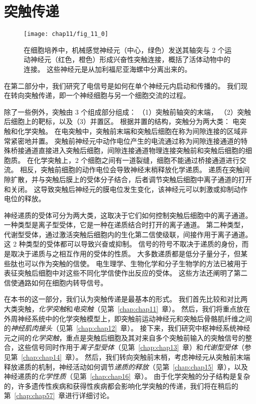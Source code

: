 \part{突触传递}


\begin{figure}[htbp]
	\centering
	\texttt{[image: chap11/fig\_11\_0]}
	\caption{在细胞培养中，机械感觉神经元（中心，绿色）发送其轴突与 2 个运动神经元（红色，橙色）形成兴奋性突触连接，概括了活体动物中的连接。
		这些神经元是从加利福尼亚海螺中分离出来的。}
	\label{fig:11_0}
\end{figure}


在第二部分中，我们研究了电信号是如何在单个神经元内启动和传播的。
我们现在转向突触传递，即一个神经细胞与另一个细胞交流的过程。


除了一些例外，突触由 3 个组成部分组成：
（1）突触前轴突的末端，
（2）突触后细胞上的靶标，以及（3）并置区。
根据并置的结构，突触分为两大类：
电突触和化学突触。
在电突触中，突触前末端和突触后细胞在称为间隙连接的区域非常紧密地并置。
突触前神经元中动作电位产生的电流通过称为间隙连接通道的特殊桥接通道直接进入突触后细胞，间隙连接通道物理连接突触前和突触后细胞的细胞质。
在化学突触上，2 个细胞之间有一道裂缝，细胞不能通过桥接通道进行交流。
相反，突触前细胞的动作电位会导致神经末梢释放化学递质。
递质在突触间隙扩散，并与突触后膜上的受体分子结合，后者调节突触后细胞中离子通道的打开和关闭。
这导致突触后神经元的膜电位发生变化，该神经元可以刺激或抑制动作电位的释放。


神经递质的受体可分为两大类，这取决于它们如何控制突触后细胞中的离子通道。
一种类型是离子型受体，它是一种在递质结合时打开的离子通道。
第二种类型，代谢型受体，通过激活突触后细胞内的生化第二信使级联，间接作用于离子通道。
这 2 种类型的受体都可以导致兴奋或抑制。
信号的符号不取决于递质的身份，而是取决于递质与之相互作用的受体的性质。
大多数递质都是低分子量分子，但某些肽也可以作为突触的信使。
电生理学、生物化学和分子生物学的方法已被用于表征突触后细胞中对这些不同化学信使作出反应的受体。
这些方法还阐明了第二信使通路如何在细胞内转导信号。


在本书的这一部分，我们认为突触传递是最基本的形式。
我们首先比较和对比两大类突触，\textit{化学突触}和\textit{电突触}（见第~\ref{chap:chap11}~章）。
然后，我们将重点放在外周神经系统中的化学突触模型上，即突触前运动神经元和突触后骨骼肌纤维之间的\textit{神经肌肉接头}（见第~\ref{chap:chap12}~章）。
接下来，我们研究中枢神经系统神经元之间的\textit{化学突触}，重点是突触后细胞及其对来自多个突触前输入的突触信号的整合，这些信号同时作用于\textit{离子型受体}（见第~\ref{chap:chap13}~章）和\textit{代谢型受体}（参见第~\ref{chap:chap14}~章）。
然后，我们转向突触前末梢，考虑神经元从突触前末端释放递质的机制，神经活动如何调节\textit{递质的释放}（见第~\ref{chap:chap15}~章），以及神经递质的\textit{化学性质}（见第~\ref{chap:chap16}~章）。
由于化学突触的分子结构是复杂的，许多遗传性疾病和获得性疾病都会影响化学突触的传递，我们将在稍后的第~\ref{chap:chap57}~章进行详细讨论。



